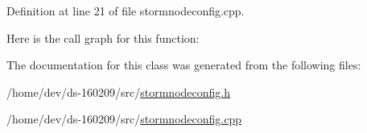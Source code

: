 Definition at line 21 of file stormnodeconfig.\+cpp.



Here is the call graph for this function\+:




The documentation for this class was generated from the following files\+:\begin{DoxyCompactItemize}
\item 
/home/dev/ds-\/160209/src/\hyperlink{stormnodeconfig_8h}{stormnodeconfig.\+h}\item 
/home/dev/ds-\/160209/src/\hyperlink{stormnodeconfig_8cpp}{stormnodeconfig.\+cpp}\end{DoxyCompactItemize}
